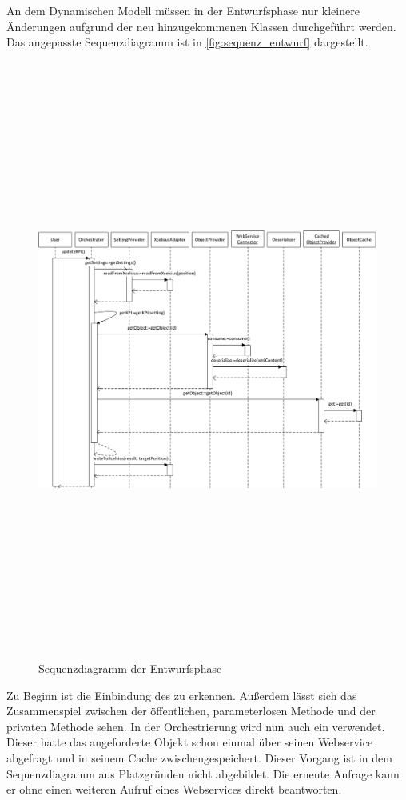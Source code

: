 \begin{onehalfspacing}
An dem Dynamischen Modell müssen in der Entwurfsphase nur kleinere Änderungen aufgrund der neu hinzugekommenen Klassen durchgeführt werden. Das angepasste Sequenzdiagramm ist in \vref{fig:sequenz_entwurf} dargestellt.

\begin{figure}[!ht]
\centering
\setlength{\unitlength}{1mm}
\includegraphics[angle=90,height=197mm]{Visio/Entwurf-Sequenz.pdf}
\caption{Sequenzdiagramm der Entwurfsphase\label{fig:sequenz_entwurf}}
\end{figure}

Zu Beginn ist die Einbindung des  zu erkennen. Außerdem lässt sich das Zusammenspiel zwischen der öffentlichen, parameterlosen Methode  und der privaten Methode  sehen. In der Orchestrierung wird nun auch ein  verwendet. Dieser hatte das angeforderte Objekt schon einmal über seinen Webservice abgefragt und in seinem Cache zwischengespeichert. Dieser Vorgang ist in dem Sequenzdiagramm aus Platzgründen nicht abgebildet. Die erneute Anfrage kann er ohne einen weiteren Aufruf eines Webservices direkt beantworten.


\end{onehalfspacing}
